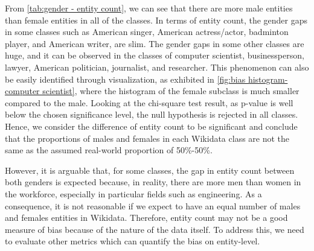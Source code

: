 From \autoref{tab:gender - entity count}, we can see that there are more male entities than female entities in all of the classes. In terms of entity count, the gender gaps in some classes such as American singer, American actress/actor, badminton player, and American writer, are slim. The gender gaps in some other classes are huge, and it can be observed in the classes of computer scientist, businessperson, lawyer, American politician, journalist, and researcher. This phenomenon can also be easily identified through visualization, as exhibited in \autoref{fig:bias histogram-computer scientist}, where the histogram of the female subclass is much smaller compared to the male. Looking at the chi-square test result, as p-value is well below the chosen significance level, the null hypothesis is rejected in all classes. Hence, we consider the difference of entity count to be significant and conclude that the proportions of males and females in each Wikidata class are not the same as the assumed real-world proportion of 50\%-50\%.

However, it is arguable that, for some classes, the gap in entity count between both genders is expected because, in reality, there are more men than women in the workforce, especially in particular fields such as engineering. As a consequence, it is not reasonable if we expect to have an equal number of males and females entities in Wikidata. Therefore, entity count may not be a good measure of bias because of the nature of the data itself. To address this, we need to evaluate other metrics which can quantify the bias on entity-level.

